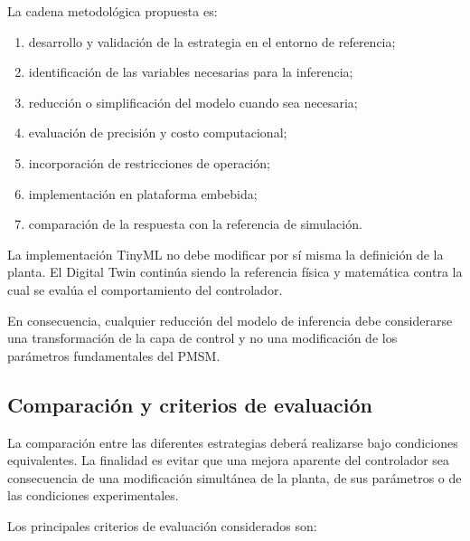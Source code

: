La cadena metodológica propuesta es:

\begin{enumerate}
\item desarrollo y validación de la estrategia en el entorno de referencia;
\item identificación de las variables necesarias para la inferencia;
\item reducción o simplificación del modelo cuando sea necesaria;
\item evaluación de precisión y costo computacional;
\item incorporación de restricciones de operación;
\item implementación en plataforma embebida;
\item comparación de la respuesta con la referencia de simulación.
\end{enumerate}

La implementación TinyML no debe modificar por sí misma la definición de la planta. El Digital Twin continúa siendo la referencia física y matemática contra la cual se evalúa el comportamiento del controlador.

En consecuencia, cualquier reducción del modelo de inferencia debe considerarse una transformación de la capa de control y no una modificación de los parámetros fundamentales del PMSM.

\subsection{Comparación y criterios de evaluación}

La comparación entre las diferentes estrategias deberá realizarse bajo condiciones equivalentes. La finalidad es evitar que una mejora aparente del controlador sea consecuencia de una modificación simultánea de la planta, de sus parámetros o de las condiciones experimentales.

Los principales criterios de evaluación considerados son:

